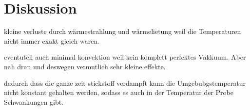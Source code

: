 \section{Diskussion}
\label{sec:Diskussion}


kleine verluste durch wärmestrahlung und wärmelietung weil die Temperaturen nicht immer
exakt gleich waren.

eventutell auch minimal konvektion weil kein komplett perfektes Vakkuum. Aber nah
dran und deswegen vermutlich sehr kleine effekte.

dadurch dass die ganze zeit stickstoff verdampft kann die Umgebubgstemperatur
nicht konstant gehalten werden, sodass es auch in der Temperatur der Probe Schwankungen
gibt.
